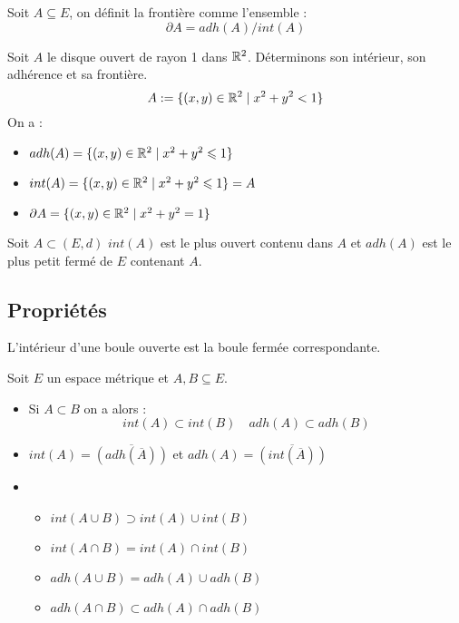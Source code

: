 \begin{definition}[Frontière]
    Soit $A \subseteq E$, on définit la frontière comme l'ensemble :
        \[ \partial A = adh(A) / int(A) \] 
\end{definition}

\begin{example}
    Soit $A$ le disque ouvert de rayon 1 dans $\mathbb{R}^2$. Déterminons son intérieur, son adhérence et sa frontière. 
        \[ A := \{ (x,y) \in \mathbb{R}^2 \; | \; x^2 + y^2 < 1 \} \] 
    On a : 
    \begin{itemize}
        \item $adh(A) = \{ (x,y) \in \mathbb{R}^2 \; | \; x^2 + y^2 \leqslant 1 \} $
        \item $int(A) = \{ (x,y) \in \mathbb{R}^2 \; | \; x^2 + y^2 \leqslant 1 \} = A $
        \item $\partial A = \{ (x,y) \in \mathbb{R}^2 \; | \; x^2 + y^2 = 1 \} $
    \end{itemize}
\end{example}

\begin{proposition}
    Soit $A \subset (E,d)$ $int(A)$ est le plus ouvert contenu dans $A$ et $adh(A)$ est le plus petit 
    fermé de $E$ contenant $A$. 
\end{proposition}


\subsection{Propriétés}

\begin{proposition}
    L'intérieur d'une boule ouverte est la boule fermée correspondante. 
\end{proposition}

\begin{prop}
    Soit $E$ un espace métrique et $A,B \subseteq E$. 
    \begin{itemize}
        \item Si $A \subset B$ on a alors :
            \[ int(A) \subset int(B) \quad adh(A) \subset adh(B) \] 
        \item $int(A) = \overline{(adh(\overline{A}))} $ et $ adh(A) = \overline{(int(\overline{A}))}$ 
        \item 
        \begin{itemize}
            \item $ int(A \cup B) \supset int(A) \cup int(B) $
            \item $ int(A \cap B) = int(A) \cap int(B) $
            \item $ adh(A \cup B) = adh(A) \cup adh(B) $
            \item $ adh(A \cap B) \subset adh(A) \cap adh(B) $
        \end{itemize}
    \end{itemize}
\end{prop}

